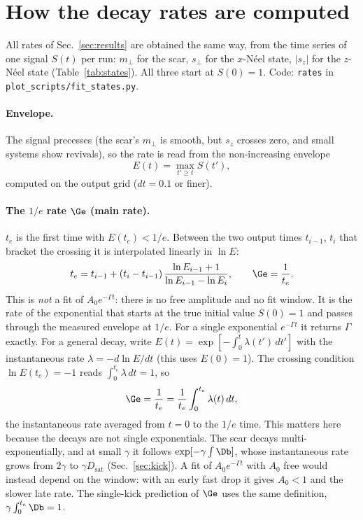 \section{How the decay rates are computed}
\label{sec:rates}

All rates of Sec.~\ref{sec:results} are obtained the same way, from the time series of one signal $S(t)$ per run: $m_\perp$ for the scar, $s_\perp$ for the $x$-N\'eel state, $\lvert s_z\rvert$ for the $z$-N\'eel state (Table~\ref{tab:states}). All three start at $S(0) = 1$. Code: \texttt{rates} in \texttt{plot\_scripts/fit\_states.py}.

\paragraph{Envelope.} The signal precesses (the scar's $m_\perp$ is smooth, but $s_z$ crosses zero, and small systems show revivals), so the rate is read from the non-increasing envelope
\begin{equation}
E(t) = \max_{t' \ge t} S(t'),
\end{equation}
computed on the output grid ($dt = 0.1$ or finer).

\paragraph{The $1/e$ rate $\Ge$ (main rate).} $t_e$ is the first time with $E(t_e) < 1/e$. Between the two output times $t_{i-1}$, $t_i$ that bracket the crossing it is interpolated linearly in $\ln E$:
\begin{equation}
t_e = t_{i-1} + (t_i - t_{i-1})\,\frac{\ln E_{i-1} + 1}{\ln E_{i-1} - \ln E_i}, \qquad \Ge = \frac{1}{t_e}.
\end{equation}
This is \emph{not} a fit of $A_0 e^{-\Gamma t}$: there is no free amplitude and no fit window. It is the rate of the exponential that starts at the true initial value $S(0) = 1$ and passes through the measured envelope at $1/e$. For a single exponential $e^{-\Gamma t}$ it returns $\Gamma$ exactly. For a general decay, write $E(t) = \exp[-\int_0^t \lambda(t')\,dt']$ with the instantaneous rate $\lambda = -d\ln E/dt$ (this uses $E(0) = 1$). The crossing condition $\ln E(t_e) = -1$ reads $\int_0^{t_e}\lambda\,dt = 1$, so
\begin{equation}
\Ge = \frac{1}{t_e} = \frac{1}{t_e}\int_0^{t_e} \lambda(t)\,dt,
\end{equation}
the instantaneous rate averaged from $t = 0$ to the $1/e$ time. This matters here because the decays are not single exponentials. The scar decays multi-exponentially, and at small $\gamma$ it follows $\exp[-\gamma\int\Db]$, whose instantaneous rate grows from $2\gamma$ to $\gamma D_{\mathrm{sat}}$ (Sec.~\ref{sec:kick}). A fit of $A_0 e^{-\Gamma t}$ with $A_0$ free would instead depend on the window: with an early fast drop it gives $A_0 < 1$ and the slower late rate. The single-kick prediction of $\Ge$ uses the same definition, $\gamma\int_0^{t_e}\Db = 1$.

